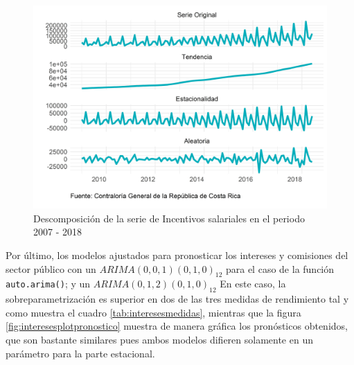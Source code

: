 \documentclass[
]{article}
\begin{document}
\begin{figure}[!h]
\includegraphics[width=1\linewidth,height=1\textheight]{Tesis_files/figure-latex/interesesplotdescomposicion-1} \caption{Descomposición de la serie de Incentivos salariales en el periodo 2007 - 2018}\label{fig:interesesplotdescomposicion}
\end{figure}

Por último, los modelos ajustados para pronosticar los intereses y
comisiones del sector público con un \(ARIMA(0,0,1)(0,1,0)_{12}\) para
el caso de la función \texttt{auto.arima()}; y un
\(ARIMA(0,1,2)(0,1,0)_{12}\) En este caso, la sobreparametrización es
superior en dos de las tres medidas de rendimiento tal y como muestra el
cuadro \ref{tab:interesesmedidas}, mientras que la figura
\ref{fig:interesesplotpronostico} muestra de manera gráfica los
pronósticos obtenidos, que son bastante similares pues ambos modelos
difieren solamente en un parámetro para la parte estacional.

\begin{table}[!h]

\caption{\label{tab:unnamed-chunk-19}\label{tab:interesesmedidas}Medidas de rendimiento según método de estimación para los intereses y comisiones del sector público}
\centering
{}
\end{table}
\end{document}
